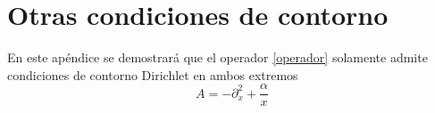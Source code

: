 \chapter{Otras condiciones de contorno}\label{Apendice.3}



En este apéndice se demostrará que el operador \ref{operador} solamente admite condiciones de contorno Dirichlet en ambos extremos
\begin{equation}
A = - \partial ^2 _x + \frac{\alpha}{x}
\end{equation}




